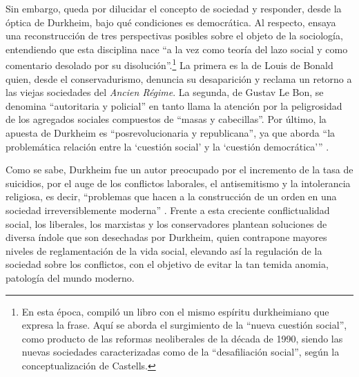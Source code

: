 {Sin embargo, queda por dilucidar el concepto de sociedad y responder, desde la óptica de Durkheim, bajo qué condiciones es democrática. Al respecto, \textcite[21]{1592-DEIPOLA1997} ensaya una reconstrucción de tres perspectivas posibles sobre el objeto de la sociología, entendiendo que esta disciplina nace \enquote{a la vez como teoría del lazo social y como comentario desolado por su disolución}.\footnote{En esta época, \textcite{1609-DEIPOLA1998} compiló un libro con el mismo espíritu durkheimiano que expresa la frase. Aquí se aborda el surgimiento de la \enquote{nueva cuestión social}, como producto de las reformas neoliberales de la década de 1990, siendo las nuevas sociedades caracterizadas como de la \enquote{desafiliación social}, según la conceptualización de Castells.} La primera es la de Louis de Bonald quien, desde el conservadurismo, denuncia su desaparición y reclama un retorno a las viejas sociedades del \emph{Ancien Régime}. La segunda, de Gustav Le Bon, se denomina \enquote{autoritaria y policial} en tanto llama la atención por la peligrosidad de los agregados sociales compuestos de \enquote{masas y cabecillas}. Por último, la apuesta de Durkheim es \enquote{posrevolucionaria y republicana}, ya que aborda \enquote{la problemática relación entre la \enquote{cuestión social} y la \enquote{cuestión democrática}} \parencite[36]{1592-DEIPOLA1997}.

Como se sabe, Durkheim fue un autor preocupado por el incremento de la tasa de suicidios, por el auge de los conflictos laborales, el antisemitismo y la intolerancia religiosa, es decir, \enquote{problemas que hacen a la construcción de un orden en una sociedad  irreversiblemente moderna} \parencite[36]{1592-DEIPOLA1997}. Frente a esta creciente conflictualidad social, los liberales, los marxistas y los conservadores plantean soluciones de diversa índole que son desechadas por Durkheim, quien contrapone mayores niveles de reglamentación de la vida social, elevando así la regulación de la sociedad sobre los conflictos, con el objetivo de evitar la tan temida anomia, patología del mundo moderno.

}
